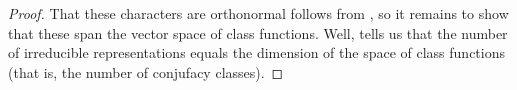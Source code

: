 \documentclass{article}
\begin{document}
\begin{proof}
	That these characters are orthonormal follows from , so it remains to show that these span the vector space of class functions. Well,  tells us that the number of irreducible representations equals the dimension of the space of class functions (that is, the number of conjufacy classes).
\end{proof}
\end{document}
